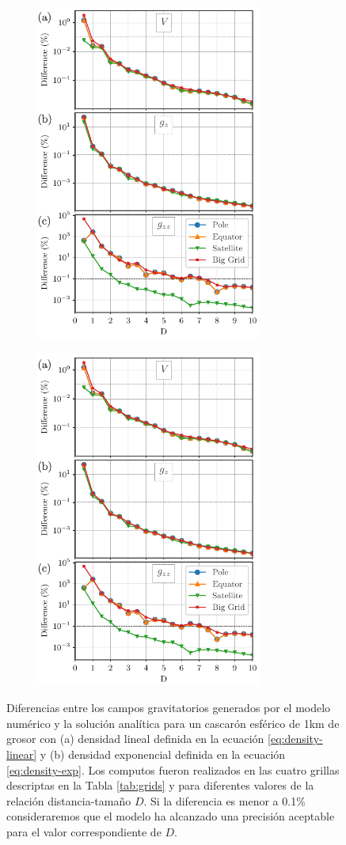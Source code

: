 \documentclass[a4paper,10pt]{article}
\begin{document}
\begin{figure}
    \begin{subfigure}[t]{0.5\textwidth}
    \centering
    \includegraphics[height=30em]{../manuscript/figures/Dlinear-thin-differences.pdf}
    \caption{}
    \label{fig:D-linear-thin}
    \end{subfigure}
    \quad
    \begin{subfigure}[t]{0.5\textwidth}
    \centering
    \includegraphics[height=30em]{../manuscript/figures/Dexp-shifted-thin-differences.pdf}
    \caption{}
    \label{fig:D-exp-thin}
    \end{subfigure}
    \caption{
        Diferencias entre los campos gravitatorios generados por el modelo numérico y la solución analítica para un cascarón esférico de 1km de grosor con (a) densidad lineal definida en la ecuación \ref{eq:density-linear} y (b) densidad exponencial definida en la ecuación \ref{eq:density-exp}. Los computos fueron realizados en las cuatro grillas descriptas en la Tabla \ref{tab:grids} y para diferentes valores de la relación distancia-tamaño $D$. Si la diferencia es menor a 0.1\% consideraremos que el modelo ha alcanzado una precisión aceptable para el valor correspondiente de $D$.
    }
\end{figure}
\end{document}
